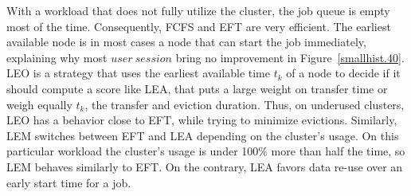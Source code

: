 \documentclass[conference]{IEEEtran}
\newcommand{\us}{\ensuremath{\mathit{user~session}}\xspace}
\newcommand{\uss}{\ensuremath{\mathit{user~sessions}}\xspace}
\newcommand{\rev}[1]{{\color{black}{#1}}}
\begin{document}


With a workload that does not fully utilize the cluster, the job queue is empty most of the time.
Consequently, FCFS and EFT are very efficient. The earliest available node is in
most cases a node that can start the job immediately, explaining why most \us bring no improvement in Figure~\ref{smallhist.40}.
LEO is a strategy that uses the earliest available time $t_k$ of a node to decide if it should compute a score like LEA,
that puts a large weight on transfer time
or weigh equally $t_k$, the transfer and eviction duration. 
Thus, on underused clusters, LEO has a behavior close to EFT, while trying to minimize evictions.
Similarly, LEM switches between EFT and LEA depending on the cluster's usage.
On this particular workload the cluster's usage is under 100\% more than half the time, so LEM behaves similarly to EFT.
On the contrary, LEA favors data re-use over an early start time for a job.
\end{document}
